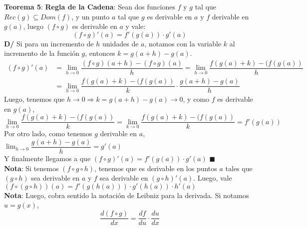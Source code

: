 \documentclass[11pt,a4paper]{article}
\newcommand*{\QEDA}{\null\nobreak\hfill\ensuremath{\blacksquare}}
\begin{document}
\noindent \textbf{Teorema 5}: \textbf{Regla de la Cadena}: Sean dos funciones $f$ y $g$ tal que $Rec(g) \subseteq Dom(f)$, y un punto $a$ tal que $g$ es derivable en $a$ y $f$ derivable en $g(a)$, luego $(f \circ g)$ es derivable en $a$ y vale: $$(f \circ g)'(a) = f'(g(a)) \cdot g'(a)$$
\textbf{D/} Si para un incremento de $h$ unidades de $a$, notamos con la variable $k$ al incremento de la funci\'on $g$, entonces $k = g(a+h)-g(a)$.
\begin{align*}
(f\circ g)'(a)
& = \displaystyle{\lim_{h \to 0} \dfrac{(f \circ g)(a+h) - (f \circ g)(a)}{h}}
  = \displaystyle{\lim_{h \to 0} \dfrac{f(g(a)+k)-(f(g(a))}{h}}\\
& = \displaystyle{\lim_{h \to 0} \dfrac{f(g(a)+k)-(f(g(a))}{k} \cdot \dfrac{g(a+h)-g(a)}{h}}
\end{align*}
Luego, tenemos que $h\rightarrow0 \Rightarrow k = g(a+h)-g(a) \rightarrow 0$, y como $f$ es derivable en $g(a)$,
$$\lim_{h \to 0} \dfrac{f(g(a)+k)-(f(g(a))}{k} = \lim_{k \to 0} \dfrac{f(g(a)+k)-(f(g(a))}{k} = f'(g(a))$$
Por otro lado, como tenemos $g$ derivable en $a$, $\displaystyle{\lim_{h \to 0} \dfrac{g(a+h)-g(a)}{h} = g'(a)}$\\
Y finalmente llegamos a que $(f \circ g)'(a) = f'(g(a)) \cdot g'(a)$ \QEDA\\

\noindent \textbf{Nota}: Si tenemos $(f \circ g \circ h)$, tenemos que es derivable en los puntos $a$ tales que $(g \circ h)$ sea derivable en $a$ y $f$ sea derivable en $(g \circ h)'(a)$. Luego, vale $(f \circ (g \circ h))(a) = f'(g(h(a))) \cdot g'(h(a)) \cdot h'(a)$\\

\noindent \textbf{Nota}: Luego, cobra sentido la notaci\'on de Leibniz para la derivada. Si notamos $u = g(x)$, $$\dfrac{d(f \circ g)}{dx} = \dfrac{df}{du} \cdot \dfrac{du}{dx}$$
\end{document}
